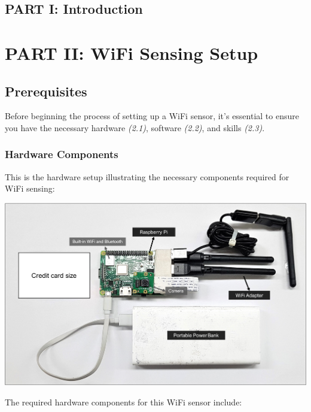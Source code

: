 \documentclass[
  letterpaper,
]{scrbook}
\begin{document}

\hypertarget{part-i-introduction}{%
\chapter*{PART I: Introduction}\label{part-i-introduction}}


\part{PART II: WiFi Sensing Setup}

\hypertarget{prerequisites}{%
\chapter{Prerequisites}\label{prerequisites}}

Before beginning the process of setting up a WiFi sensor, it's essential
to ensure you have the necessary hardware \emph{(2.1)}, software
\emph{(2.2)}, and skills \emph{(2.3)}.

\hypertarget{hardware-components}{%
\section{Hardware Components}\label{hardware-components}}

This is the hardware setup illustrating the necessary components
required for WiFi sensing:

\includegraphics{content/material/ch2/sensor_comp.png}

The required hardware components for this WiFi sensor include:
\end{document}

